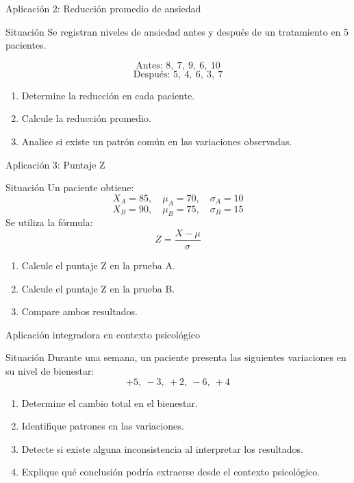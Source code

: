 \documentclass[aspectratio=169,10pt]{beamer}
\begin{document}
	\begin{frame}{Aplicación 2: Reducción promedio de ansiedad}
		\begin{block}{Situación}
			Se registran niveles de ansiedad antes y después de un tratamiento en 5 pacientes.
			
			\[
			\text{Antes: } 8,\ 7,\ 9,\ 6,\ 10
			\]
			\[
			\text{Después: } 5,\ 4,\ 6,\ 3,\ 7
			\]
		\end{block}
		
		\begin{enumerate}[<+->]
			\item Determine la reducción en cada paciente.
			\item Calcule la reducción promedio.
			\item Analice si existe un patrón común en las variaciones observadas.
		\end{enumerate}
	\end{frame}
	
	\begin{frame}{Aplicación 3: Puntaje Z}
		\begin{block}{Situación}
			Un paciente obtiene:
			\[
			X_A=85,\quad \mu_A=70,\quad \sigma_A=10
			\]
			\[
			X_B=90,\quad \mu_B=75,\quad \sigma_B=15
			\]
			Se utiliza la fórmula:
			\[
			Z=\frac{X-\mu}{\sigma}
			\]
		\end{block}
		
		\begin{enumerate}[<+->]
			\item Calcule el puntaje Z en la prueba A.
			\item Calcule el puntaje Z en la prueba B.
			\item Compare ambos resultados.
		\end{enumerate}
	\end{frame}
	
	\begin{frame}{Aplicación integradora en contexto psicológico}
		\begin{block}{Situación}
			Durante una semana, un paciente presenta las siguientes variaciones en su nivel de bienestar:
			\[
			+5,\ -3,\ +2,\ -6,\ +4
			\]
		\end{block}
		
		\begin{enumerate}[<+->]
			\item Determine el cambio total en el bienestar.
			\item Identifique patrones en las variaciones.
			\item Detecte si existe alguna inconsistencia al interpretar los resultados.
			\item Explique qué conclusión podría extraerse desde el contexto psicológico.
		\end{enumerate}
	\end{frame}
	
\end{document}
